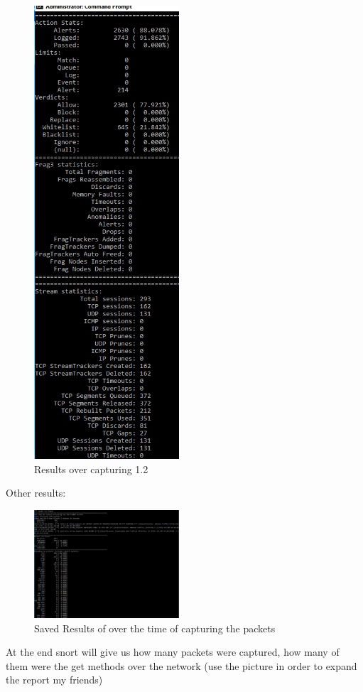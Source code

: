 \documentclass{article}
\begin{document}
\begin{figure}[H]
	\begin{center}
		\includegraphics[width=0.48\textwidth]{Res2.jpg}
	\end{center}
	\caption{Results over capturing 1.2}
	\label{fig:Res2}
\end{figure}


Other results:

\begin{figure}[H]
	\begin{center}
		\includegraphics[width=0.48\textwidth]{Res3.jpg}
	\end{center}
	\caption{Saved Results of over the time of capturing the packets}
	\label{fig:Res3}
\end{figure}

At the end snort will give us how many packets were captured, how many of them were the get methods over the network (use the picture in order to expand the report my friends)




\end{document}
